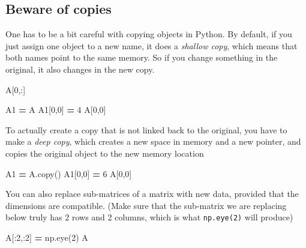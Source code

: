 \documentclass[
  letterpaper,
]{scrbook}
\newenvironment{Shaded}{\begin{snugshade}}{\end{snugshade}}
\newcommand{\DecValTok}[1]{\textcolor[rgb]{0.00,0.00,0.81}{#1}}
\newcommand{\NormalTok}[1]{#1}
\newcommand{\OperatorTok}[1]{\textcolor[rgb]{0.81,0.36,0.00}{\textbf{#1}}}
\begin{document}
\hypertarget{beware-of-copies}{%
\subsection{Beware of copies}\label{beware-of-copies}}

One has to be a bit careful with copying objects in Python. By default, if you just assign one object to a new name, it does a \emph{shallow copy}, which means that both names point to the same memory. So if you change something in the original, it also changes in the new copy.

\begin{Shaded}
\begin{Highlighting}[]
\NormalTok{A[}\DecValTok{0}\NormalTok{,:]}
\end{Highlighting}
\end{Shaded}

\begin{Shaded}
\begin{Highlighting}[]
\NormalTok{A1 }\OperatorTok{=}\NormalTok{ A}
\NormalTok{A1[}\DecValTok{0}\NormalTok{,}\DecValTok{0}\NormalTok{] }\OperatorTok{=} \DecValTok{4}
\NormalTok{A[}\DecValTok{0}\NormalTok{,}\DecValTok{0}\NormalTok{]}
\end{Highlighting}
\end{Shaded}

To actually create a copy that is not linked back to the original, you have to make a \emph{deep copy}, which creates a new space in memory and a new pointer, and copies the original object to the new memory location

\begin{Shaded}
\begin{Highlighting}[]
\NormalTok{A1 }\OperatorTok{=}\NormalTok{ A.copy()}
\NormalTok{A1[}\DecValTok{0}\NormalTok{,}\DecValTok{0}\NormalTok{] }\OperatorTok{=} \DecValTok{6}
\NormalTok{A[}\DecValTok{0}\NormalTok{,}\DecValTok{0}\NormalTok{]}
\end{Highlighting}
\end{Shaded}

You can also replace sub-matrices of a matrix with new data, provided that the dimensions are compatible. (Make sure that the sub-matrix we are replacing below truly has 2 rows and 2 columns, which is what \texttt{np.eye(2)} will produce)

\begin{Shaded}
\begin{Highlighting}[]
\NormalTok{A[:}\DecValTok{2}\NormalTok{,:}\DecValTok{2}\NormalTok{] }\OperatorTok{=}\NormalTok{ np.eye(}\DecValTok{2}\NormalTok{)}
\NormalTok{A}
\end{Highlighting}
\end{Shaded}
\end{document}
